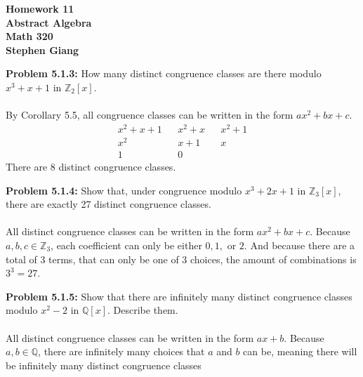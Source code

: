 \documentclass[12pt]{article}
\begin{document}
	
	\begin{center}
		\textbf{Homework 11} \\
		\textbf{Abstract Algebra} \\
		\textbf{Math 320} \\
		\textbf{Stephen Giang} \\
	\end{center}

\noindent \textbf{Problem 5.1.3: }How many distinct congruence classes are there modulo $x^3 + x + 1$ in $\mathbb{Z}_2[x]$.
\\ \\
By Corollary 5.5, all congruence classes can be written in the form $ax^2 + bx + c$.
	\begin{align*}
		x^2 + x + 1 && x^2 + x && x^2 + 1 \\
		x^2			&& x + 1   && x 	  \\
		1			&& 0
	\end{align*} 
There are 8 distinct congruence classes.

\newpage 

\noindent \textbf{Problem 5.1.4: }Show that, under congruence modulo $x^3 + 2x + 1$ in $\mathbb{Z}_3[x]$, there are exactly 27 distinct congruence classes. 
\\ \\
All distinct congruence classes can be written in the form $ax^2 + bx + c$.  Because $a,b,c \in \mathbb{Z}_3$, each coefficient can only be either $0,1,$ or $2$. And because there are a total of 3 terms, that can only be one of 3 choices, the amount of combinations is $3^3 = 27$.

\newpage 

\noindent \textbf{Problem 5.1.5: }Show that there are infinitely many distinct congruence classes modulo $x^2 - 2$ in $\mathbb{Q}[x]$. Describe them. 
\\ \\
All distinct congruence classes can be written in the form $ax + b$.  Because $a,b \in \mathbb{Q}$, there are infinitely many choices that $a$ and $b$ can be, meaning there will be infinitely many distinct congruence classes

\newpage 
\end{document}
